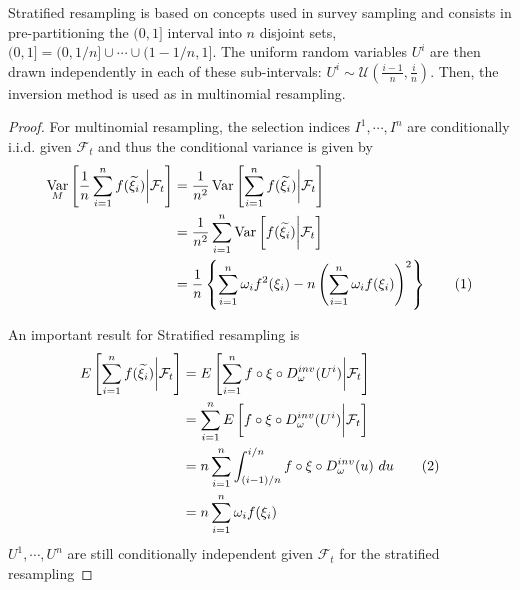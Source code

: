 \documentclass[11pt,a4,twosided,singlespacing,titlepagenumber=on]{scrreprt}
\numberwithin{equation}{chapter} %
\theoremstyle{remark}
\DeclareMathOperator{\var}{Var}
\newcommand\numberthis{\addtocounter{equation}{1}\tag{\theequation}}
\begin{document}
Stratified resampling is based on concepts used in survey sampling and consists in pre-partitioning the $(0,1]$ interval into $n$ disjoint sets, $(0,1] = (0, 1/n] \cup \cdots \cup (1-1/n, 1]$. The uniform random variables $U^i$ are then drawn independently in each of these sub-intervals: $U^i \sim \mathcal{U}\left( \frac{i-1}{n}, \frac{i}{n} \right)$. Then, the inversion method is used as in multinomial resampling.


\begin{proof}
For multinomial resampling, the selection indices $I^1,\cdots,I^n$ are conditionally i.i.d. given $\mathcal{F}_t$ and thus the conditional variance is given by
\begin{align*}
\var_M \left[ \frac{1}{n} \sum_{i=1}^n f(\widetilde{\xi_i}) \bigg| \mathcal{F}_t \right] &= \frac{1}{n^2} \var \left[ \sum_{i=1}^n f(\widetilde{\xi_i}) \bigg| \mathcal{F}_t \right] \\
																					  &= \frac{1}{n^2} \sum_{i=1}^n \var \left[ f(\widetilde{\xi_i}) \bigg| \mathcal{F}_t \right] \\
																					  &= \frac{1}{n} \left\{\sum_{i=1}^n \omega_i f^2(\xi_i) - n \left(\sum_{i=1}^n \omega_i f(\xi_i)\right)^2\right\} \numberthis
\end{align*}

An important result for Stratified resampling is
\begin{align*}
E \left[ \sum_{i=1}^n f(\widetilde{\xi_i})  \bigg| \mathcal{F}_t \right] &= E \left[ \sum_{i=1}^n f \circ \xi \circ D_\omega^{inv}(U^i) \bigg| \mathcal{F}_t \right] \\
																  &= \sum_{i=1}^n E \left[ f \circ \xi \circ D_\omega^{inv}(U^i) \bigg| \mathcal{F}_t \right] \\
																  &= n \sum_{i=1}^n \int_{(i-1)/n}^{i/n} f \circ \xi \circ D_\omega^{inv}(u)\text{ }du \numberthis \\
																  &= n \sum_{i=1}^n \omega_i f(\xi_i)
\end{align*}
$U^1,\cdots,U^n$ are still conditionally independent given $\mathcal{F}_t$ for the stratified resampling


\end{proof}
\end{document}
